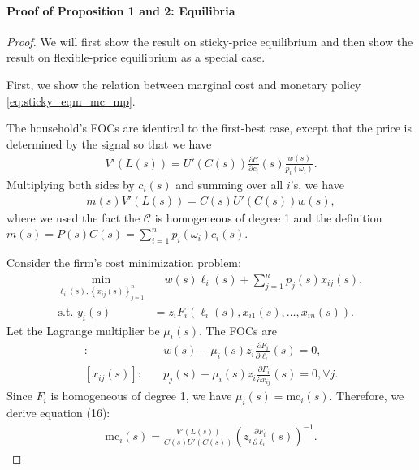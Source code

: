 \documentclass[12pt]{article}
\numberwithin{equation}{section}
\begin{document}
\paragraph{Proof of Proposition 1 and 2: Equilibria}
\begin{proof}
    We will first show the result on sticky-price equilibrium and then show the result on flexible-price equilibrium as a special case.

    First, we show the relation between marginal cost and monetary policy \eqref{eq:sticky_eqm_mc_mp}.

    The household's FOCs are identical to the first-best case, except that the price is determined by the signal so that we have
    \begin{align}\label{eq:sticky_eqm_foc}
        V'(L(s)) = U'(C(s)) \frac{\partial \mathcal{C}}{\partial c_i}(s) \frac{w(s)}{p_i(\omega_i)}.
    \end{align}
    Multiplying both sides by $c_i(s)$ and summing over all $i$'s, we have
    \begin{align*}
        m(s) V'(L(s)) = C(s) U'(C(s)) w(s),
    \end{align*}
    where we used the fact the $\mathcal{C}$ is homogeneous of degree 1 and the definition $m(s) = P(s) C(s) = \sum_{i=1}^n p_i(\omega_i) c_i(s)$.

    Consider the firm's cost minimization problem:
    \begin{align*}
        \min_{\ell_{i}(s), \left\{x_{ij}(s)\right\}_{j=1}^n} &\quad w(s) \ell_{i}(s) + \sum_{j=1}^n p_{j}(s) x_{ij}(s), \\
        \text{s.t. } y_{i}(s) &= z_i F_i(\ell_{i}(s), x_{i1}(s), \dots, x_{in}(s)).
    \end{align*}
    Let the Lagrange multiplier be $\mu_i(s)$. The FOCs are 
    \begin{align*}
        [\ell_{i}(s)]: &\quad w(s) - \mu_i(s) z_i \frac{\partial F_i}{\partial \ell_{i}}(s) = 0,\\
        [x_{ij}(s)]: &\quad p_{j}(s) - \mu_i(s) z_i \frac{\partial F_i}{\partial x_{ij}}(s) = 0, \forall j.
    \end{align*}
    Since $F_i$ is homogeneous of degree 1, we have $\mu_i(s) = \text{mc}_i(s)$. Therefore, we derive equation (16):
    \begin{align*}
        \text{mc}_i(s) = \frac{V'(L(s))}{C(s) U'(C(s))} \left(z_i \frac{\partial F_i}{\partial \ell_{i}}(s) \right)^{-1}.
    \end{align*}


\end{proof}
\end{document}
